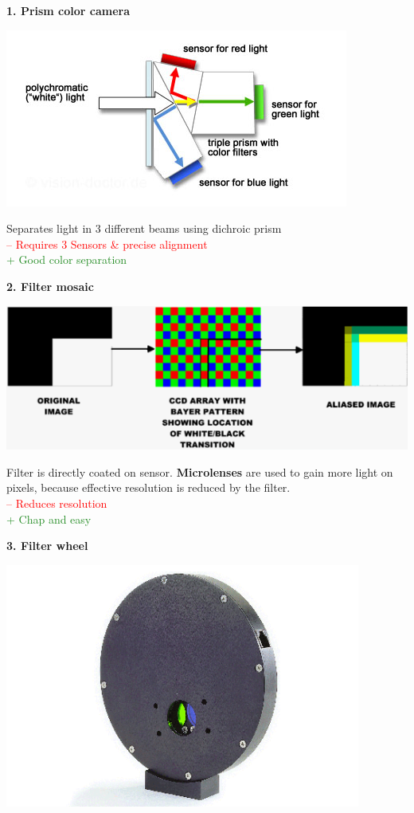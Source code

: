 \documentclass[a4paper, fontsize=8pt, landscape, DIV=1]{scrartcl}
\begin{document}
\begin{multicols*}{4}
		\textbf{1. Prism color camera}\\
		\begin{center}
			\includegraphics[width=0.7\columnwidth]{images/ImageAcq/prism_color_camera.png}\\
		\end{center}
		Separates light in 3 different beams using dichroic prism\\ 
		\textcolor{red}{ -- Requires 3 Sensors \& precise alignment}\\
		\textcolor{ForestGreen}{+ Good color separation}
		\par 
		\textbf{2. Filter mosaic}\\
		\vspace{-0.3cm}
		\begin{center}
			\includegraphics[width=0.9\columnwidth]{images/ImageAcq/bayer_filter.png}\\
		\end{center}
		Filter is directly coated on sensor. \textbf{Microlenses} are used to gain more light on pixels, because effective resolution is reduced by the filter.\\
		\textcolor{red}{ -- Reduces resolution}\\
		\textcolor{ForestGreen}{+ Chap and easy}
		\par 
		\textbf{3. Filter wheel}\\
		\begin{center}
			\includegraphics[width=0.7\columnwidth]{images/ImageAcq/filter_wheel.png}\\

\end{center}
\end{multicols*}
\end{document}
